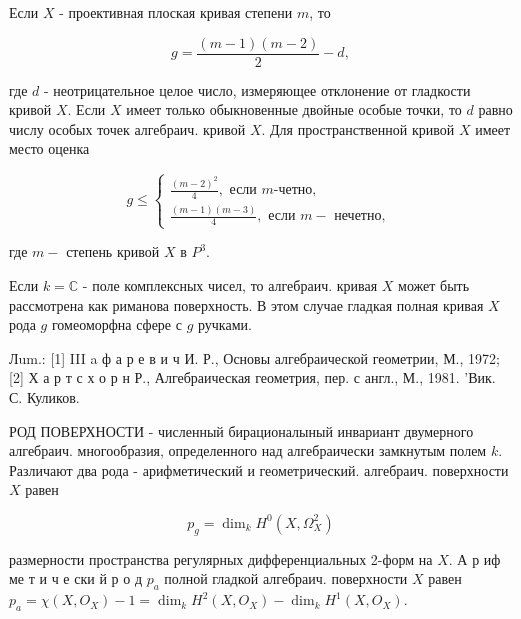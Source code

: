 \documentclass[10pt]{article}
\begin{document}
Если $X$ - проективная плоская кривая степени $m$, то



\[

g=\frac{(m-1)(m-2)}{2}-d,

\]



где $d$ - неотрицательное целое число, измеряющее отклонение от гладкости кривой $X$. Если $X$ имеет только обыкновенные двойные особые точки, то $d$ равно числу особых точек алгебраич. кривой $X$. Для пространственной кривой $X$ имеет место оценка



\[

g \leqslant\left\{\begin{array}{l}

\frac{(m-2)^{2}}{4}, \text { если } m \text {-четно, } \\

\frac{(m-1)(m-3)}{4}, \text { если } m-\text { нечетно, }

\end{array}\right.

\]



где $m-$ степень кривой $X$ в $P^{3}$.



Если $k=\mathbb{C}$ - поле комплексных чисел, то алгебраич. кривая $X$ может быть рассмотрена как риманова поверхность. В этом случае гладкая полная кривая $X$ рода $g$ гомеоморфна сфере с $g$ ручками.



Лum.: [1] III a ф а р е в и ч И. Р., Основы алгебраической геометрии, М., 1972; [2] Х а р т с х о р н Р., Алгебраическая геометрия, пер. с англ., М., 1981. 'Вик. С. Куликов.



РОД ПОВЕРХНОСТИ - численный бирационалыный инвариант двумерного алгебраич. многообразия, определенного над алгебраически замкнутым полем $k$. Различают два рода - арифметический и геометрический. алгебраич. поверхности $X$ равен



\[

p_{g}=\operatorname{dim}_{k} H^{0}\left(X, \Omega_{X}^{2}\right)

\]



размерности пространства регулярных дифференциальных 2-форм на $X$. А р иф ме т и ч е ски й р о д $p_{a}$ полной гладкой алгебраич. поверхности $X$ равен $p_{a}=\chi\left(X, O_{X}\right)-1=\operatorname{dim}_{k} H^{2}\left(X, O_{X}\right)-\operatorname{dim}_{k} H^{1}\left(X, O_{X}\right)$.
\end{document}
